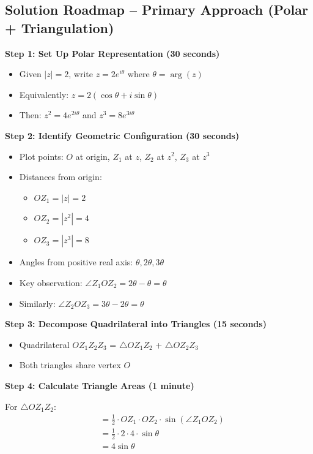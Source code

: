 \documentclass[12pt]{article}
\begin{document}
\begin{solutionbox}
\subsection*{Solution Roadmap -- Primary Approach (Polar + Triangulation)}

\textbf{Step 1: Set Up Polar Representation (30 seconds)}
\begin{itemize}
    \item Given $|z| = 2$, write $z = 2e^{i\theta}$ where $\theta = \arg(z)$
    \item Equivalently: $z = 2(\cos\theta + i\sin\theta)$
    \item Then: $z^2 = 4e^{2i\theta}$ and $z^3 = 8e^{3i\theta}$
\end{itemize}

\textbf{Step 2: Identify Geometric Configuration (30 seconds)}
\begin{itemize}
    \item Plot points: $O$ at origin, $Z_1$ at $z$, $Z_2$ at $z^2$, $Z_3$ at $z^3$
    \item Distances from origin:
    \begin{itemize}
        \item $OZ_1 = |z| = 2$
        \item $OZ_2 = |z^2| = 4$
        \item $OZ_3 = |z^3| = 8$
    \end{itemize}
    \item Angles from positive real axis: $\theta, 2\theta, 3\theta$
    \item Key observation: $\angle Z_1OZ_2 = 2\theta - \theta = \theta$
    \item Similarly: $\angle Z_2OZ_3 = 3\theta - 2\theta = \theta$
\end{itemize}

\textbf{Step 3: Decompose Quadrilateral into Triangles (15 seconds)}
\begin{itemize}
    \item Quadrilateral $OZ_1Z_2Z_3$ = $\triangle OZ_1Z_2$ + $\triangle OZ_2Z_3$
    \item Both triangles share vertex $O$
\end{itemize}

\textbf{Step 4: Calculate Triangle Areas (1 minute)}

For $\triangle OZ_1Z_2$:
\begin{align*}
[\triangle OZ_1Z_2] &= \frac{1}{2} \cdot OZ_1 \cdot OZ_2 \cdot \sin(\angle Z_1OZ_2) \\
&= \frac{1}{2} \cdot 2 \cdot 4 \cdot \sin\theta \\
&= 4\sin\theta
\end{align*}


\end{solutionbox}
\end{document}
